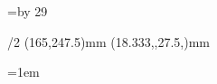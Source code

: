 \fontfam[berlingltstd]
\currvar

\typosize[11/15.71]

\svlang

\hsize=110mm
\vsize=\topskip \advance \vsize by 29\baselineskip

\margins/2 (165,247.5)mm (18.333,,27.5,)mm

\parskip=0pt
\parindent=1em

\baselineskip



